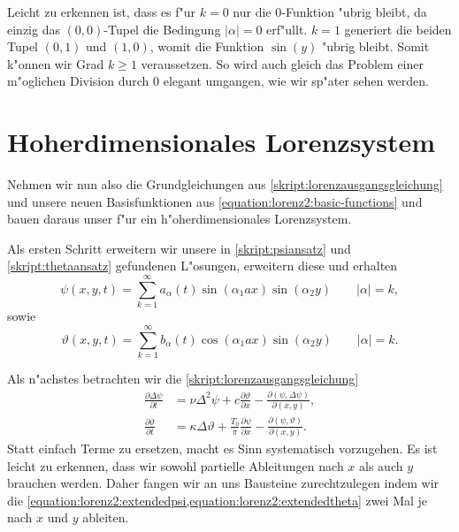 \begin{refsection}
Leicht zu erkennen ist, dass es f"ur $k = 0$ nur die $0$-Funktion 
"ubrig bleibt, da einzig das $(0, 0)$-Tupel die Bedingung $|\alpha| = 0$ 
erf"ullt. $k = 1$ generiert die beiden Tupel $(0, 1)$ und $(1, 0)$, womit die 
Funktion $\sin(y)$ "ubrig bleibt. Somit k"onnen wir Grad $k \geq 1$ 
veraussetzen. So wird auch gleich das Problem einer m"oglichen Division durch 
$0$ elegant umgangen, wie wir sp"ater sehen werden.

\section{Hoherdimensionales Lorenzsystem\label{section:lorenz2:ho-model}}
Nehmen wir nun also die Grundgleichungen aus 
\cref{skript:lorenzausgangsgleichung} und unsere neuen Basisfunktionen aus 
\cref{equation:lorenz2:basic-functions} und bauen daraus unser f"ur ein 
h"oherdimensionales Lorenzsystem.

Als ersten Schritt erweitern wir unsere in \cref{skript:psiansatz} und 
\cref{skript:thetaansatz} gefundenen L"osungen, erweitern diese und erhalten
\begin{equation}
\psi(x,y,t) =
\sum_{k = 1}^{\infty}
a_{\alpha}(t)
\sin(\alpha_1 ax) \sin(\alpha_2 y)
\qquad |\alpha| = k,
\label{equation:lorenz2:extendedpsi}
\end{equation}
sowie
\begin{equation}
\vartheta(x,y,t) =
\sum_{k = 1}^{\infty}
b_{\alpha}(t)
\cos(\alpha_1 ax) \sin(\alpha_2 y)
\qquad |\alpha| = k.
\label{equation:lorenz2:extendedtheta}
\end{equation}

Als n"achstes betrachten wir die \cref{skript:lorenzausgangsgleichung}
\begin{align*}
\frac{\partial\Delta\psi}{\partial t}
&=
\nu\Delta^2\psi 
+c\frac{\partial\vartheta}{\partial x}
-\frac{\partial(\psi,\Delta\psi)}{\partial(x,y)},
\\
\frac{\partial\vartheta}{\partial t}
&=
\kappa\Delta\vartheta
+ \frac{T_0}{\pi}\frac{\partial\psi}{\partial x}
- \frac{\partial(\psi,\vartheta)}{\partial(x,y)}.
\end{align*}
Statt einfach Terme zu ersetzen, macht es Sinn systematisch vorzugehen. Es ist 
leicht zu erkennen, dass wir sowohl partielle Ableitungen nach $x$ als auch $y$ 
brauchen werden. Daher fangen wir an uns Bausteine zurechtzulegen indem wir die 
\cref{equation:lorenz2:extendedpsi,equation:lorenz2:extendedtheta} 
zwei Mal je nach $x$ und $y$ ableiten.


\end{refsection}
